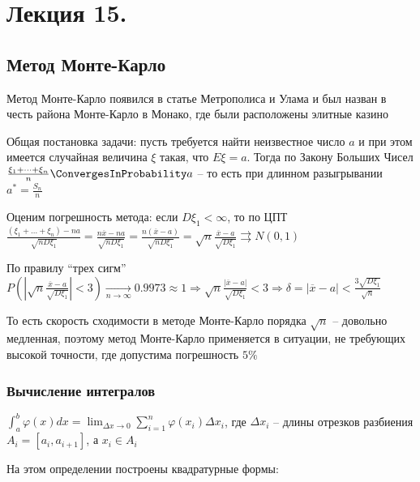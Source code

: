 \documentclass[12pt]{article}
\begin{document}






\section{Лекция 15.}

\subsection{Метод Монте-Карло}

Метод Монте-Карло появился в статье Метрополиса и Улама и был назван в честь района Монте-Карло в Монако, где были расположены элитные казино


Общая постановка задачи: пусть требуется найти неизвестное число $a$ и при этом имеется случайная величина $\xi$ такая, что $E \xi = a$. Тогда по Закону Больших Чисел $\frac{\xi_1 + \dots + \xi_n}{n} \ConvergesInProbability a$ -- то есть при длинном разыгрывании $a^* = \frac{S_n}{n}$

Оценим погрешность метода: если $D\xi_1 < \infty$, то по ЦПТ $\frac{(\xi_1 + \dots + \xi_n) - n a}{\sqrt{n D \xi_1}} = \frac{n \overline{x} - na}{\sqrt{n D\xi_1}} = \frac{n(\overline{x} - a)}{\sqrt{n D\xi_1}} = \sqrt{n} \frac{\overline{x} - a}{\sqrt{D\xi_1}} \rightrightarrows N(0, 1)$

По правилу \enquote{трех сигм} $P\left(\left|\sqrt{n} \frac{\overline{x} - a}{\sqrt{D\xi_1}}\right| < 3\right) \underset{n \to \infty}{\longrightarrow} 0.9973 \approx 1 \Longrightarrow \sqrt{n} \frac{|\overline{x} - a|}{\sqrt{D \xi_1}} < 3 \Longrightarrow \delta = |\overline{x} - a| < \frac{3\sqrt{D\xi_1}}{\sqrt{n}}$

\Nota То есть скорость сходимости в методе Монте-Карло порядка $\sqrt{n}$ -- довольно медленная, поэтому метод Монте-Карло применяется в ситуации, не требующих высокой точности, где допустима погрешность $5\%$

\subsubsection{Вычисление интегралов}

\Mem $\int_a^b \varphi(x) dx = \lim_{\Delta x \to 0} \sum_{i = 1}^n \varphi(x_i) \Delta x_i$, где $\Delta x_i$ -- длины отрезков разбиения $A_i = [a_i, a_{i + 1}]$, а $x_i \in A_i$

На этом определении построены квадратурные формы:
\end{document}
